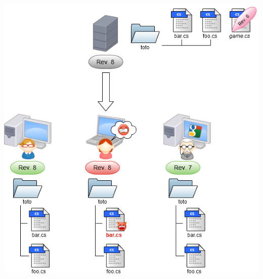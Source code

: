 \begin{frame}
  \begin{center}
    \includegraphics[scale=0.3]{images/14-Conflict.png}
  \end{center}
\end{frame}

